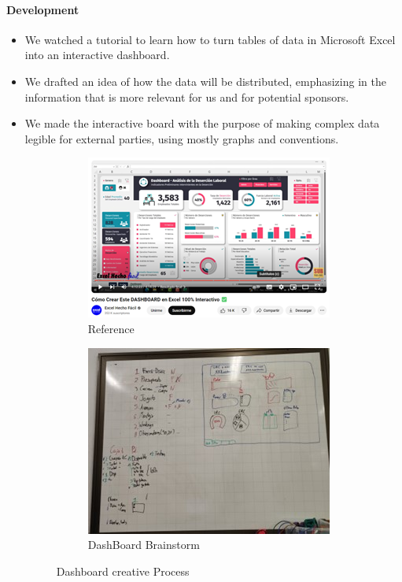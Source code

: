 \documentclass{article}
\begin{document}
\paragraph{Development}
\begin{itemize}
    \item We watched a tutorial to learn how to turn tables of data in Microsoft Excel into an interactive dashboard. 
    \item We drafted an idea of how the data will be distributed, emphasizing in the information that is more relevant for us and for potential sponsors.
    \item We made the interactive board with the purpose of making complex data legible for external parties, using mostly graphs and conventions.
    \begin{figure}[H]
        \centering
        \begin{subfigure}{.5\textwidth}
          \centering
          \includegraphics[width=.8\linewidth]{Images/Design/TutorialDash.png}
          \caption{Reference}
          
        \end{subfigure}%
        \begin{subfigure}{.5\textwidth}
          \centering
          \includegraphics[width=.8\linewidth]{Images/Design/IdeaDash.jpg}
          \caption{DashBoard Brainstorm}
          
        \end{subfigure}
        \caption{Dashboard creative Process}
        
    \end{figure}
\end{itemize}
\end{document}
